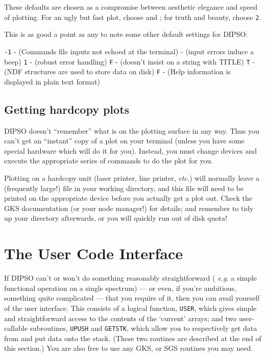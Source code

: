 These defaults are chosen as a compromise between aesthetic elegance and
speed of plotting. For an ugly but fast plot, choose  and ; for
truth and beauty, choose   {\tt{2}}. 

This is as good a point as any to note some other default settings for
DIPSO:

  {\tt{-1}}  - (Commands file inputs not echoed at the terminal) \newline
{}  - (input errors induce a beep) \newline
{}  {\tt{1}}  - (robust error handling) \newline
{}  {\tt{F}}  - (doesn't insist on a string with TITLE) \newline
{}  {\tt{T}}  - (NDF structures are used to store data on disk) \newline
{}  {\tt{F}}  - (Help information is displayed in  plain text format) \newline

\subsection {Getting hardcopy plots}

DIPSO doesn't ``remember'' what is on the plotting surface in any way.
Thus you can't get an ``instant'' copy of a plot on your terminal
(unless you have some special hardware which will do it for you).
Instead, you must change devices and execute the appropriate series
of commands to do the plot for you.

Plotting on a hardcopy unit (laser printer, line printer, {\em etc.})
will normally leave a (frequently large!) file in your working
directory, and this file will need to be printed on the appropriate
device before you actually get a plot out. Check the GKS documentation
(or your node manager!) for details; and remember to tidy up your
directory afterwards, or you will quickly run out of disk quota!

\section {The User Code Interface}

If DIPSO can't or won't do something reasonably straightforward ({\em
e.g.} a simple functional operation on a single spectrum) --- or even,
if you're ambitious, something quite complicated --- that you
require of it, then you can avail yourself of the user interface. This
consists of a logical function, {\tt{USER}},  which gives simple and
straightforward access to the contents of the `current' arrays; and
two user-callable subroutines, {\tt{UPUSH}}  and {\tt{GETSTK}},  which
allow you to respectively get data from and put data onto the stack.
(These two routines are described at the end of this section.) You are
also free to use any GKS, or SGS routines you may need.

